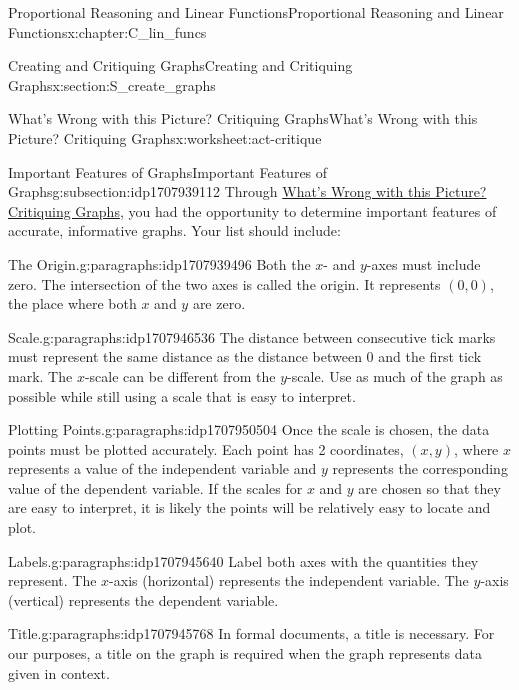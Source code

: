 \documentclass[oneside,10pt,]{book}
\numberwithin{equation}{chapter}
\begin{document}
\begin{chapterptx}{Proportional Reasoning and Linear Functions}{}{Proportional Reasoning and Linear Functions}{}{}{x:chapter:C_lin_funcs}
\begin{sectionptx}{Creating and Critiquing Graphs}{}{Creating and Critiquing Graphs}{}{}{x:section:S_create_graphs}
\begin{worksheet-subsection}{What's Wrong with this Picture? Critiquing Graphs}{}{What's Wrong with this Picture? Critiquing Graphs}{}{}{x:worksheet:act-critique}
\begin{conclusion}{}
\begin{itemize}[label=\textbullet]
\end{itemize}
%
\end{conclusion}%
\end{worksheet-subsection}
\restoregeometry
%
%
\typeout{************************************************}
\typeout{************************************************}
%
\begin{subsectionptx}{Important Features of Graphs}{}{Important Features of Graphs}{}{}{g:subsection:idp1707939112}
Through \hyperref[x:worksheet:act-critique]{What's Wrong with this Picture? Critiquing Graphs}, you had the opportunity to determine important features of accurate, informative graphs. Your list should include:%
\begin{paragraphs}{The Origin.}{g:paragraphs:idp1707939496}%
Both the \(x\)- and \(y\)-axes must include zero. The intersection of the two axes is called the origin. It represents \((0, 0)\), the place where both \(x\) and \(y\) are zero.%
\end{paragraphs}%
\begin{paragraphs}{Scale.}{g:paragraphs:idp1707946536}%
The distance between consecutive tick marks must represent the same distance as the distance between 0 and the first tick mark. The \(x\)-scale can be different from the \(y\)-scale. Use as much of the graph as possible while still using a scale that is easy to interpret.%
\end{paragraphs}%
\begin{paragraphs}{Plotting Points.}{g:paragraphs:idp1707950504}%
Once the scale is chosen, the data points must be plotted accurately. Each point has 2 coordinates, \((x, y)\), where \(x\) represents a value of the independent variable and \(y\) represents the corresponding value of the dependent variable. If the scales for \(x\) and \(y\) are chosen so that they are easy to interpret, it is likely the points will be relatively easy to locate and plot.%
\end{paragraphs}%
\begin{paragraphs}{Labels.}{g:paragraphs:idp1707945640}%
Label both axes with the quantities they represent. The \(x\)-axis (horizontal) represents the independent variable. The \(y\)-axis (vertical) represents the dependent variable.%
\end{paragraphs}%
\begin{paragraphs}{Title.}{g:paragraphs:idp1707945768}%
In formal documents, a title is necessary. For our purposes, a title on the graph is required when the graph represents data given in context.%

\end{paragraphs}
\end{subsectionptx}
\end{sectionptx}
\end{chapterptx}
\end{document}
